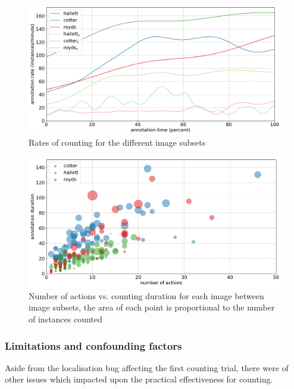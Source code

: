\begin{figure}[ht]
\centering
\includegraphics[width=1.0\linewidth]{charts/aerial_penguins/summaries/instance_rates.pdf}
\caption{ Rates of counting for the different image subsets }
\label{fig:penguin_rates}
\end{figure}

\begin{figure}[ht]
\centering
\includegraphics[width=1.0\linewidth]{charts/aerial_penguins/actions_time_a.pdf}
\caption{ Number of actions vs. counting duration for each image between image subsets, the area of each point is proportional to the number of instances counted }
\label{fig:actions_time_penguins}
\end{figure}


\subsubsection{Limitations and confounding factors}

Aside from the localisation bug affecting the first counting trial, there were of other issues which impacted upon the practical effectiveness for counting.

